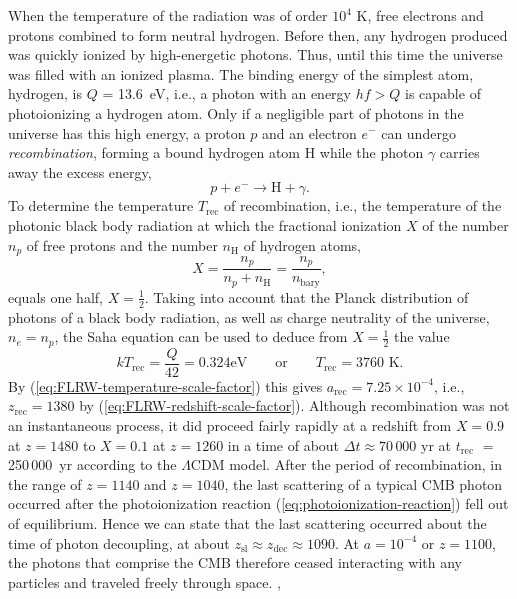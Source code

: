 When the temperature of the radiation was of order $10^4$ K, free electrons and protons combined to form neutral hydrogen. Before then, any hydrogen produced was quickly ionized by high-energetic photons. Thus, until this time the universe was filled with an ionized plasma. The binding energy of the simplest atom, hydrogen, is $Q$ = 13.6~eV, i.e., a photon with an energy $hf > Q$ is capable of photoionizing a hydrogen atom. Only if a negligible part of photons in the universe has this high energy, a proton $p$ and an electron $e^-$ can undergo \emph{recombination},
forming a bound hydrogen atom H while the photon $\gamma$ carries away the excess energy,
\begin{equation*}
	p + e^- \to \mathrm{H} + \gamma
	.
	\label{eq:photoionization-reaction}
\end{equation*}
To determine the temperature $T_{\mathrm{rec}}$ of recombination, i.e., the temperature of the photonic black body radiation at which the fractional ionization $X$ of the number $n_p$ of free protons and the number $n_{\mathrm{H}}$ of hydrogen atoms,
\begin{equation}
	X 
	= \frac{n_p}{n_p + n_{\mathrm{H}}}
	= \frac{n_p}{n_{\mathrm{bary}}}
	,
\end{equation}
equals one half, $X = \frac{1}{2}$. Taking into account that the Planck distribution of photons of a black body radiation, as well as charge neutrality of the universe, $n_e = n_p$, the Saha equation can be used to deduce from $X=\frac12$ the value
\begin{equation}
	kT_{\mathrm{rec}}
	= \frac{Q}{42}
	= 0.324 \mbox{eV}
	\qquad \mbox{or} \qquad
	T_{\mathrm{rec}}
	= 3760 \mbox{ K}
	. 
\end{equation}
By (\ref{eq:FLRW-temperature-scale-factor}) this gives $a_{\mathrm{rec}} = 7.25 \times 10^{-4}$, i.e., $z_{\mathrm{rec}} = 1380$ by (\ref{eq:FLRW-redshift-scale-factor}).
Although recombination was not an instantaneous process, it did proceed fairly rapidly at a redshift from $X=0.9$ at $z=1480$ to $X=0.1$ at $z=1260$ in a time of about $\Delta t \approx 70\,000$ yr at $t_{\mathrm{rec}}$ $=$ 250\,000~yr according to the $\Lambda$CDM model.
After the period of recombination, in the range of $z = 1140$ and $z = 1040$, the last scattering of a typical CMB photon occurred after the photoionization reaction (\ref{eq:photoionization-reaction}) fell out of equilibrium. Hence we can state that the last scattering occurred about the time of photon decoupling, at about $z_{\mathrm{sl}} \approx z_{\mathrm{dec}} \approx 1090$.
At $a = 10^{-4}$ or $z = 1100$, the photons that comprise the CMB therefore ceased interacting with any particles and traveled freely through space.
\cite[9]{Dodelson-Schmidt-2025},
\cite[§8.3]{Ryden-2017}


